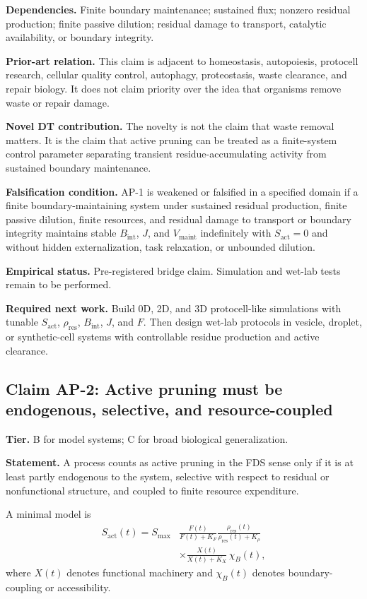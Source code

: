 \documentclass[10pt,a4paper,twocolumn,aps,prl]{revtex4-2}
\theoremstyle{claimstyle}
\theoremstyle{definition}
\newcommand{\FDS}{FDS}
\newcommand{\claimfield}[1]{\noindent\textbf{#1.}}
\newcommand{\Sactive}{S_{\mathrm{act}}}
\newcommand{\rhodebt}{\rho_{\mathrm{res}}}
\newcommand{\Bint}{B_{\mathrm{int}}}
\newcommand{\Jflow}{J}
\newcommand{\Vlife}{V_{\mathrm{maint}}}
\begin{document}
\claimfield{Dependencies} Finite boundary maintenance; sustained flux; nonzero residual production; finite passive dilution; residual damage to transport, catalytic availability, or boundary integrity.

\claimfield{Prior-art relation} This claim is adjacent to homeostasis, autopoiesis, protocell research, cellular quality control, autophagy, proteostasis, waste clearance, and repair biology. It does not claim priority over the idea that organisms remove waste or repair damage.

\claimfield{Novel DT contribution} The novelty is not the claim that waste removal matters. It is the claim that active pruning can be treated as a finite-system control parameter separating transient residue-accumulating activity from sustained boundary maintenance.

\claimfield{Falsification condition} AP-1 is weakened or falsified in a specified domain if a finite boundary-maintaining system under sustained residual production, finite passive dilution, finite resources, and residual damage to transport or boundary integrity maintains stable $\Bint$, $\Jflow$, and $\Vlife$ indefinitely with $\Sactive=0$ and without hidden externalization, task relaxation, or unbounded dilution.

\claimfield{Empirical status} Pre-registered bridge claim. Simulation and wet-lab tests remain to be performed.

\claimfield{Required next work} Build 0D, 2D, and 3D protocell-like simulations with tunable $\Sactive$, $\rhodebt$, $\Bint$, $\Jflow$, and $F$. Then design wet-lab protocols in vesicle, droplet, or synthetic-cell systems with controllable residue production and active clearance.

\subsection{Claim AP-2: Active pruning must be endogenous, selective, and resource-coupled}

\claimfield{Tier} B for model systems; C for broad biological generalization.

\claimfield{Statement} A process counts as active pruning in the \FDS{} sense only if it is at least partly endogenous to the system, selective with respect to residual or nonfunctional structure, and coupled to finite resource expenditure.

A minimal model is
\begin{equation}
\begin{aligned}
\Sactive(t)=S_{\max}
&\frac{F(t)}{F(t)+K_F}
\frac{\rhodebt(t)}{\rhodebt(t)+K_\rho} \\
&\times
\frac{X(t)}{X(t)+K_X}
\,\chi_B(t),
\end{aligned}
\end{equation}
where $X(t)$ denotes functional machinery and $\chi_B(t)$ denotes boundary-coupling or accessibility.
\end{document}
